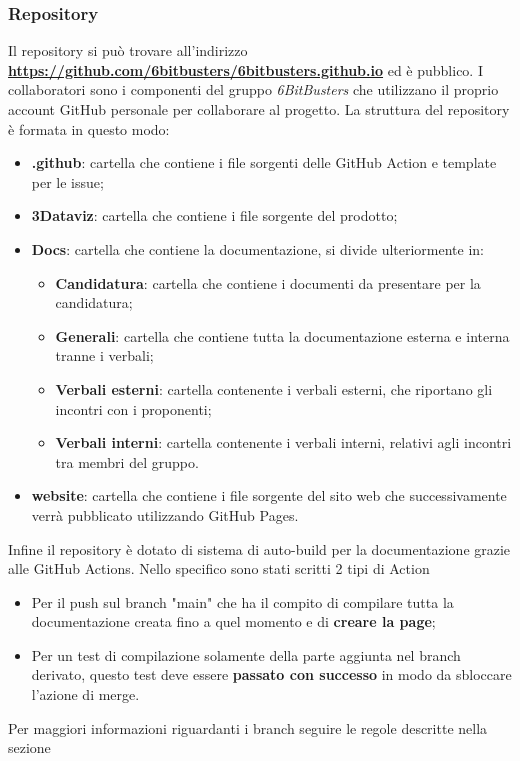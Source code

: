         \subsubsection{Repository}
        Il repository si può trovare all'indirizzo \textbf{\url{https://github.com/6bitbusters/6bitbusters.github.io}} ed è pubblico.
        I collaboratori sono i componenti del gruppo \textit{6BitBusters} che utilizzano il proprio account GitHub
        personale per collaborare al progetto.
        La struttura del repository è formata in questo modo:
            \begin{itemize}
                \item \textbf{ .github}: cartella che contiene i file sorgenti delle GitHub Action e template per le issue;
                \item \textbf{3Dataviz}: cartella che contiene i file sorgente del prodotto;
                \item \textbf{Docs}: cartella che contiene la documentazione, si divide ulteriormente in:
                    \begin{itemize}
                        \item \textbf{Candidatura}: cartella che contiene i documenti da presentare per la candidatura;
                        \item \textbf{Generali}: cartella che contiene tutta la documentazione esterna e interna tranne i verbali;
                        \item \textbf{Verbali esterni}: cartella contenente i verbali esterni, che riportano gli incontri con i proponenti;
                        \item \textbf{Verbali interni}: cartella contenente i verbali interni, relativi agli incontri tra membri del gruppo.
                    \end{itemize}
                \item \textbf{website}: cartella che contiene i file sorgente del sito web che successivamente verrà pubblicato utilizzando GitHub Pages.
            \end{itemize}
        Infine il repository è dotato di sistema di auto-build per la documentazione grazie alle GitHub Actions. Nello specifico sono stati scritti 2 tipi di Action
        \begin{itemize}
            \item Per il push sul branch "main" che ha il compito di compilare tutta la documentazione creata fino a quel momento e di \textbf{creare la page};
            \item Per un test di compilazione solamente della parte aggiunta nel branch derivato, questo test deve essere \textbf{passato con successo} in modo da sbloccare l'azione di merge.
        \end{itemize}
        Per maggiori informazioni riguardanti i branch seguire le regole descritte nella sezione 

